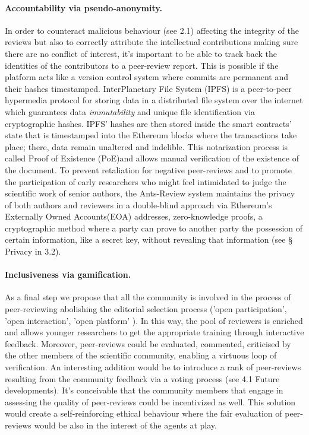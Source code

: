 \documentclass[runningheads]{llncs}
\begin{document}
\paragraph{Accountability via pseudo-anonymity.} In order to counteract malicious behaviour (see 2.1) affecting the integrity of the reviews but also to correctly attribute the intellectual contributions making sure there are no conflict of interest, it's important to be able to track back the identities of the contributors to a peer-review report. This is possible if the platform acts like a version control system where commits are permanent and their hashes timestamped. InterPlanetary File System (IPFS) \cite{IPFS} is a peer-to-peer hypermedia protocol for storing data in a distributed file system over the internet which guarantees data \emph{immutability} and unique file identification via cryptographic hashes. IPFS' hashes are then stored inside the smart contracts' state that is timestamped into the Ethereum blocks where  the transactions take place; there, data remain unaltered and indelible. This notarization process is called Proof of Existence (PoE)and allows manual verification of the existence of the document.
\newline To prevent retaliation for negative peer-reviews and to promote the participation of early researchers who might feel intimidated to judge the scientific work of senior authors, the Ants-Review system maintains the privacy of both authors and reviewers in a double-blind approach via Ethereum’s Externally Owned Accounts(EOA) addresses, zero-knowledge proofs, a cryptographic method where a party can prove to another party the possession of certain information, like a secret key, without revealing that information (see § Privacy in 3.2).

\paragraph{Inclusiveness via gamification.} As a final step we propose that all the community is involved in the process of peer-reviewing abolishing the editorial selection process ('open participation', 'open interaction', 'open platform' \cite{OPR-Ross-Hellauer}). In this way, the pool of reviewers is enriched and allows younger researchers to get the appropriate training through interactive feedback. Moreover, peer-reviews could be evaluated, commented, criticised by the other members of the scientific community, enabling a virtuous loop of verification. An interesting addition would be to introduce a rank of peer-reviews resulting from the community feedback via a voting process (see 4.1  Future developments). It's conceivable that the community members that engage in assessing the quality of peer-reviews could be incentivized as well. This solution would create a self-reinforcing ethical behaviour where the fair evaluation of peer-reviews would be also in the interest of the agents at play.
\end{document}
